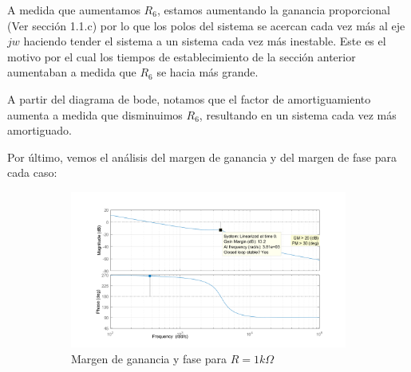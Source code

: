 \documentclass[e4_tp2_main.tex]{subfiles}
\begin{document}
  
A medida que aumentamos $R_6$, estamos aumentando la ganancia proporcional (Ver secci\'on 1.1.c) por lo que los polos del sistema se acercan cada vez m\'as al eje $jw$ haciendo tender el sistema a un sistema cada vez m\'as inestable. Este es el motivo por el cual los tiempos de establecimiento de la secci\'on anterior aumentaban a medida que $R_6$ se hacia m\'as grande. 

A partir del diagrama de bode, notamos que el factor de amortiguamiento aumenta a medida que disminuimos $R_6$, resultando en un sistema cada vez m\'as amortiguado.

Por último, vemos el análisis del margen de ganancia y del margen de fase para cada caso:
\begin{figure}[H]
  \begin{subfigure}[b]{0.5\textwidth}
    \includegraphics[width=\textwidth, height=\textwidth]{Imagenes/Punto1/fotosMarce/r1k.png}
    \caption{ Margen de ganancia y fase para $R=1 k\Omega $}
    \label{fig:f12}
  \end{subfigure}
  \hfill
  \begin{subfigure}[b]{0.5\textwidth}

\end{subfigure}
\end{figure}
\end{document}
